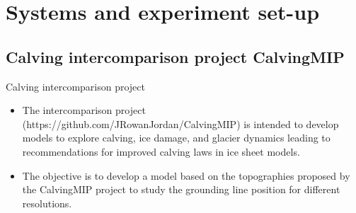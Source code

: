 \documentclass[11pt]{beamer}
\begin{document}
	\section{Systems and experiment set-up}
	\subsection{Calving intercomparison project CalvingMIP}
	\begin{frame}{Calving intercomparison project}
		\begin{itemize}
		\justifying
		\item The intercomparison project (https://github.com/JRowanJordan/CalvingMIP) is intended to develop models to explore calving, ice damage, and glacier dynamics leading to recommendations for improved calving laws in ice sheet models.
		\pause \item The objective is to develop a model based on the topographies proposed by the CalvingMIP project to study the grounding line position for different resolutions.
		\end{itemize}
		
	\end{frame}
\end{document}
